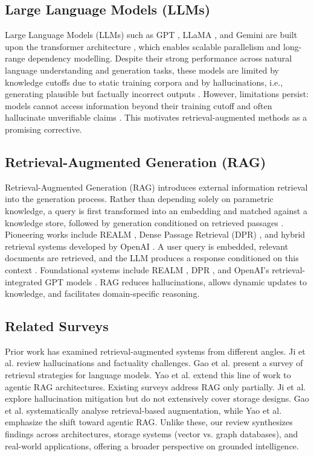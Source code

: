 \documentclass[conference]{IEEEtran}
\begin{document}
\subsection{Large Language Models (LLMs)}
Large Language Models (LLMs) such as GPT \cite{brown2020language}, LLaMA \cite{touvron2023llama}, and Gemini \cite{anil2023gemini} are built upon the transformer architecture \cite{vaswani2017attention}, which enables scalable parallelism and long-range dependency modelling. Despite their strong performance across natural language understanding and generation tasks, these models are limited by knowledge cutoffs due to static training corpora and by hallucinations, i.e., generating plausible but factually incorrect outputs \cite{ji2023survey}. However, limitations persist: models cannot access information beyond their training cutoff and often hallucinate unverifiable claims \cite{ji2023survey}. This motivates retrieval-augmented methods as a promising corrective.  


\subsection{Retrieval-Augmented Generation (RAG)}
Retrieval-Augmented Generation (RAG) introduces external information retrieval into the generation process. Rather than depending solely on parametric knowledge, a query is first transformed into an embedding and matched against a knowledge store, followed by generation conditioned on retrieved passages \cite{lewis2020rag}. Pioneering works include REALM \cite{guu2020realm}, Dense Passage Retrieval (DPR) \cite{karpukhin2020dpr}, and hybrid retrieval systems developed by OpenAI \cite{openai2023gpt}. A user query is embedded, relevant documents are retrieved, and the LLM produces a response conditioned on this context \cite{lewis2020rag}. Foundational systems include REALM \cite{guu2020realm}, DPR \cite{karpukhin2020dpr}, and OpenAI’s retrieval-integrated GPT models \cite{openai2023gpt}. RAG reduces hallucinations, allows dynamic updates to knowledge, and facilitates domain-specific reasoning.  

\subsection{Related Surveys}
Prior work has examined retrieval-augmented systems from different angles. Ji et al. \cite{ji2023survey} review hallucinations and factuality challenges. Gao et al. \cite{gao2023retrievalsurvey} present a survey of retrieval strategies for language models. Yao et al. \cite{yao2024ragreview} extend this line of work to agentic RAG architectures. Existing surveys address RAG only partially. Ji et al. \cite{ji2023survey} explore hallucination mitigation but do not extensively cover storage designs. Gao et al. \cite{gao2023retrievalsurvey} systematically analyse retrieval-based augmentation, while Yao et al. \cite{yao2024ragreview} emphasize the shift toward agentic RAG. Unlike these, our review synthesizes findings across architectures, storage systems (vector vs. graph databases), and real-world applications, offering a broader perspective on grounded intelligence.  
\end{document}
